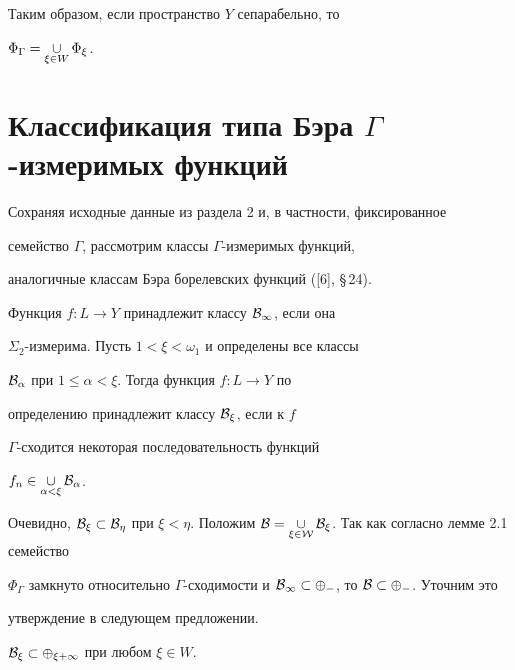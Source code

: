  


Таким образом, если пространство $Y$ сепарабельно, то 


$\Phi_\Gamma=\mathop{\cup}\limits_{\xi\in W}\Phi_\xi$. 


 


 


\section{Классификация типа Бэра $\Gamma$-измеримых функций} 


 


Сохраняя исходные данные из раздела 2 и, в частности, фиксированное 


семейство $\Gamma$, рассмотрим классы $\Gamma$-измеримых функций, 


аналогичные классам Бэра борелевских функций ([6], \S\,24). 


 


\begin{defns} 


Функция $f:L\to Y$ принадлежит классу $\cal B_1$, если она 


$\Sigma_2$-измерима. Пусть $1<\xi<\omega_1$ и определены все классы 


$\cal B_\alpha$ при $1\le\alpha<\xi$. Тогда функция $f:L\to Y$ по 


определению принадлежит классу $\cal B_\xi$, если к $f$ \ 


$\Gamma$-сходится некоторая последовательность функций 


$f_n\in\mathop{\cup}\limits_{\alpha<\xi}\cal B_\alpha$. 


\end{defns} 


 


Очевидно, $\cal B_\xi\subset\cal B_\eta$ при $\xi<\eta$. Положим $\cal 


B=\mycup_{\xi\in W}\cal B_\xi$. Так как согласно лемме 2.1 семейство 


$\Phi_\Gamma$ замкнуто относительно $\Gamma$-сходимости и $\cal 


B_1\subset\Phi_\Gamma$, то $\cal B\subset\Phi_\Gamma$. Уточним это 


утверждение в следующем предложении. 


 


\begin{props} 


$\cal B_\xi\subset\Phi_{\xi+1}$ при любом $\xi\in W$. 


\end{props} 


